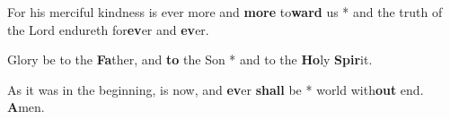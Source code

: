 \begin{multicols}{2}
	For his merciful kindness is ever more and \textbf{more} to\textbf{ward} us * and the truth of the Lord endureth for\textbf{ev}er and \textbf{ev}er.
	
	Glory be to the \textbf{Fa}ther, and \textbf{to} the Son * and to the \textbf{Ho}ly \textbf{Spir}it.
	
	As it was in the beginning, is now, and \textbf{ev}er \textbf{shall} be * world with\textbf{out} end. \textbf{A}men.
\end{multicols}